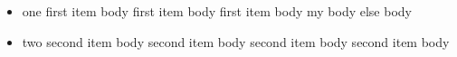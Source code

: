 \begin{itemize}
	\item one
	      first item body
	      first item body
	      first item body
          \ifnum 
          my body
          \else
          else body
          \fi
	\item two
	      second item body
	      second item body
	      second item body
	      second item body
\end{itemize}

